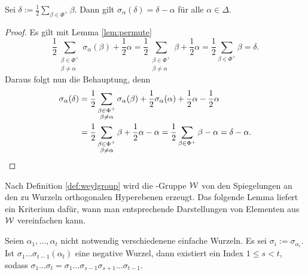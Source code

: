 \begin{cor}
  Sei $\delta := \tfrac{1}{2} \sum_{\beta \in \Phi^+} \beta$.
  Dann gilt $\sigma_\alpha(\delta) = \delta - \alpha$ für alle $\alpha \in \Delta$.
\end{cor}

\begin{proof}
  Es gilt mit Lemma \ref{lem:permute}
  \begin{displaymath}
    \frac{1}{2} \sum_{\substack{\beta \in \Phi^+\\ \beta \neq \alpha}} \sigma_\alpha(\beta) + \frac{1}{2}\alpha 
  = \frac{1}{2} \sum_{\substack{\beta \in \Phi^+\\ \beta \neq \alpha}} \beta + \frac{1}{2}\alpha
  = \frac{1}{2} \sum_{\beta \in \Phi^+} \beta
  = \delta.
  \end{displaymath}
  Daraus folgt nun die Behauptung, denn
  \begin{align*}
    \sigma_\alpha(\delta) 
    &= \frac{1}{2} \sum_{\substack{\beta \in \Phi^+\\ \beta \neq \alpha}} \sigma_\alpha(\beta) + \frac{1}{2} \sigma_\alpha(\alpha) + \frac{1}{2} \alpha - \frac{1}{2} \alpha \\
    &= \frac{1}{2} \sum_{\substack{\beta \in \Phi^+\\ \beta \neq \alpha}} \beta + \frac{1}{2} \alpha - \alpha 
    = \frac{1}{2} \sum_{\beta \in \Phi^+} \beta - \alpha 
    = \delta - \alpha. \qedhere
  \end{align*}
\end{proof}

Nach Definition \ref{def:weylgroup} wird die \weyl\hyp{}Gruppe $\mathcal{W}$ von den Spiegelungen an den zu Wurzeln orthogonalen Hyperebenen erzeugt.
Das folgende Lemma liefert ein Kriterium dafür, wann man entsprechende Darstellungen von Elementen aus $\mathcal{W}$ vereinfachen kann.

\begin{lem}
  Seien $\alpha_1,\dots,\alpha_t$ nicht notwendig verschiedenene einfache Wurzeln. Es sei $\sigma_i := \sigma_{\alpha_i}$.
  Ist $\sigma_1 \dots \sigma_{t-1}(\alpha_t)$ eine negative Wurzel, dann existiert ein Index $1 \leq s < t$, sodass $\sigma_1 \dots \sigma_t = \sigma_1 \dots \sigma_{s-1} \sigma_{s+1} \dots \sigma_{t-1}$.
\end{lem}

